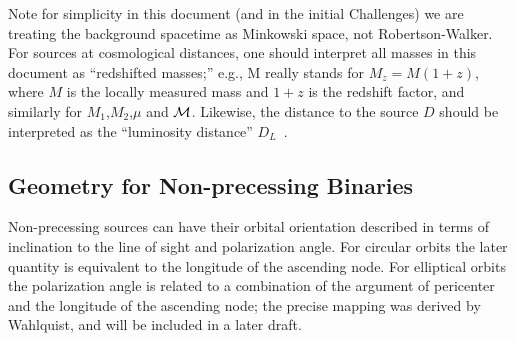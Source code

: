 \documentclass[11pt]{report}
\begin{document}
Note for simplicity in this document (and in the initial Challenges) we are treating the background spacetime as
Minkowski space, not Robertson-Walker. For sources at cosmological distances, one should
interpret all masses in this document as ``redshifted masses;'' e.g., M  really
stands for $M_z = M(1+z)$, where $M$ is the locally measured mass and $1+z$ is the 
redshift factor, and similarly for $M_1$,$M_2$,$\mu$ and ${\cal M}$.  Likewise, the distance to the source $D$ should be interpreted as the ``luminosity
distance'' $D_L$~\cite{markovic}.

\subsection{Geometry for Non-precessing Binaries}
\label{non-precbin}
Non-precessing sources can have their orbital orientation described in terms of inclination to the line of sight and
polarization angle. For circular orbits the later quantity is equivalent to the longitude of the ascending node.
For elliptical orbits the polarization angle is related to a combination of the argument of pericenter and
the longitude of the ascending node; the precise mapping was derived by Wahlquist, and will be included in a later draft.
\end{document}
